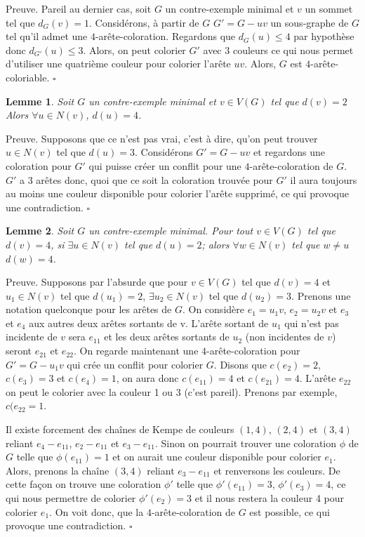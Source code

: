 \documentclass[10pt,a4paper]{article}
\newtheorem{lemme}{Lemme}
\newcommand{\ep}{{\hfill $\square$}}
\begin{document}
Preuve.
Pareil au dernier cas, soit $G$ un contre-exemple minimal et $v$ un sommet tel que $d_G(v) = 1$. Considérons, à partir de $G$ $G' = G-uv$ un sous-graphe de $G$ tel qu'il admet une $4$-arête-coloration. Regardons que $d_G(u) \leq 4$ par hypothèse donc $d_{G'}(u) \leq 3$. Alors, on peut colorier $G'$ avec $3$ couleurs ce qui nous permet d'utiliser une quatrième couleur pour colorier l'arête $uv$. Alors, $G$ est $4$-arête-coloriable.
\ep

\begin{lemme}
Soit $G$ un contre-exemple minimal et $v \in V(G)$ tel que $d(v) = 2$ Alors $\forall u \in N(v)$, $d(u) = 4$.
\end{lemme} 

Preuve.
Supposons que ce n'est pas vrai, c'est à dire, qu'on peut trouver $u \in N(v)$ tel que $d(u) = 3$. Considérons $G' = G-uv$ et regardons une coloration pour $G'$ qui puisse créer un conflit pour une $4$-arête-coloration de $G$. $G'$ a 3 arêtes donc, quoi que ce soit la coloration trouvée pour $G'$ il aura toujours au moins une couleur disponible pour colorier l'arête supprimé, ce qui provoque une contradiction.
\ep

\begin{lemme}
Soit $G$ un contre-exemple minimal. Pour tout $v \in V(G)$ tel que $d(v) = 4$, si $\exists u \in N(v)$ tel que $d(u) = 2$; alors $\forall w \in N(v)$ tel que $w \neq u$ $d(w) = 4$.
\end{lemme}

Preuve.
Supposons par l'absurde que pour $v \in V(G)$ tel que $d(v) = 4$ et $u_1 \in N(v)$ tel que $d(u_1) = 2$, $\exists u_2 \in N(v)$ tel que $d(u_2) = 3$. Prenons une notation quelconque pour les arêtes de $G$. On considère $e_1 = u_1v$, $e_2 = u_2v$ et $e_3$ et $e_4$ aux autres deux arêtes sortants de v. L'arête sortant de $u_1$ qui n'est pas incidente de $v$ sera $e_{11}$ et les deux arêtes sortants de $u_2$ (non incidentes de $v$) seront $e_{21}$ et $e_{22}$. On regarde maintenant une $4$-arête-coloration pour $G' = G-u_1v$ qui crée un conflit pour colorier $G$. Disons que $c(e_2)=2$, $c(e_3)=3$ et $c(e_4)=1$, on aura donc $c(e_{11})=4$ et $c(e_{21})=4$. L'arête $e_{22}$ on peut le colorier avec la couleur 1 ou 3 (c'est pareil). Prenons par exemple, $c(e_{22} = 1$.

Il existe forcement des chaînes de Kempe de couleurs $(1,4)$, $(2,4)$ et $(3,4)$ reliant $e_4-e_{11}$, $e_2-e_{11}$ et $e_3-e_{11}$. Sinon on pourrait trouver une coloration $\phi$ de $G$ telle que $\phi(e_{11}) = 1$ et on aurait une couleur disponible pour colorier $e_1$. Alors, prenons la chaîne $(3,4)$ reliant $e_3-e_{11}$ et renversons les couleurs. De cette façon on trouve une coloration $\phi'$ telle que $\phi'(e_{11})=3$, $\phi'(e_3) = 4$, ce qui nous permettre de colorier $\phi'(e_2) = 3$ et il nous restera la couleur 4 pour colorier $e_1$. On voit donc, que la $4$-arête-coloration de $G$ est possible, ce qui provoque une contradiction.
\ep
\end{document}
